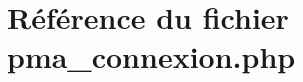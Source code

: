 \hypertarget{pma__connexion_8php}{
\section{R\'{e}f\'{e}rence du fichier pma\_\-connexion.php}
\label{pma__connexion_8php}
}
